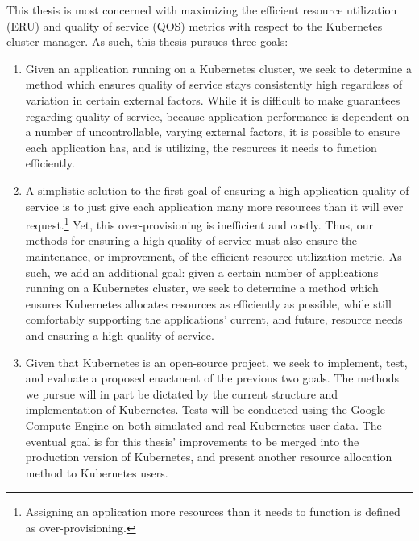 This thesis is most concerned with maximizing the efficient resource utilization
(ERU) and quality of service (QOS) metrics with respect to the Kubernetes cluster manager.
As such, this thesis pursues three goals:

\begin{enumerate}
  \item Given an application running on a Kubernetes cluster, we seek to
    determine a method which ensures quality of
    service stays consistently high regardless of variation in
    certain external factors. While it is
    difficult to make guarantees regarding quality of service, because
    application performance is dependent on a number of uncontrollable, varying
    external factors, it is possible to
    ensure each application has, and is utilizing, the resources it needs to
    function efficiently.
  \item A simplistic solution to the first goal of ensuring a high application
    quality of service is to just give each application many more resources than
    it will ever request.\footnote{Assigning an application more resources than it needs
    to function is defined as over-provisioning.}
    Yet, this over-provisioning is inefficient and costly. Thus, our
    methods for ensuring a high quality of service must also ensure the
    maintenance, or improvement, of the efficient resource utilization metric.
    As such, we add an additional goal: given a certain number of applications
    running on a Kubernetes cluster,
    we seek to determine a method which ensures Kubernetes allocates resources
    as efficiently as possible, while still comfortably
    supporting the applications' current, and future, resource needs and
    ensuring a high quality of service.
  \item Given that Kubernetes is an open-source project, we seek to implement, test, and
    evaluate a proposed enactment of the previous two goals.
    The methods we pursue will
    in part be dictated by the current structure and implementation of
    Kubernetes. Tests will be conducted using the Google Compute
    Engine\cite{google-compute-engine} on both
    simulated and real Kubernetes user data. The eventual goal is for this
    thesis' improvements to be merged into the production version of Kubernetes,
    and present another resource allocation method to Kubernetes users.
\end{enumerate}

